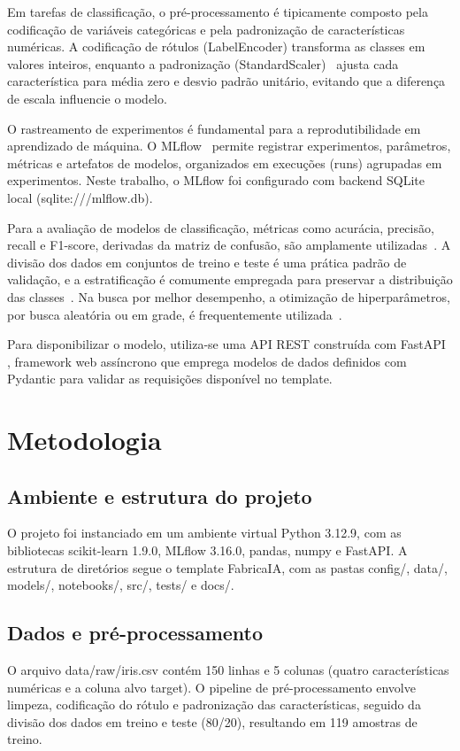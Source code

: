 \documentclass[12pt]{article}
\begin{document}
Em tarefas de classificação, o pré-processamento é tipicamente composto pela codificação de variáveis
categóricas e pela padronização de características numéricas. A codificação de rótulos (LabelEncoder)
transforma as classes em valores inteiros, enquanto a padronização (StandardScaler)~\cite{pedregosa2011sklearn} ajusta cada
característica para média zero e desvio padrão unitário, evitando que a diferença de escala influencie
o modelo.

O rastreamento de experimentos é fundamental para a reprodutibilidade em aprendizado de máquina. O MLflow~
\cite{zaharia2018mlflow} permite registrar experimentos, parâmetros, métricas e artefatos de modelos,
organizados em execuções (runs) agrupadas em experimentos. Neste trabalho, o MLflow foi configurado com
backend SQLite local (sqlite:///mlflow.db).

Para a avaliação de modelos de classificação, métricas como acurácia, precisão, recall e F1-score, 
derivadas da matriz de confusão, são amplamente utilizadas~\cite{sokolova2009systematic}. 
A divisão dos dados em conjuntos de treino e teste é uma prática padrão de validação, 
e a estratificação é comumente empregada para preservar a distribuição das classes~\cite{kohavi1995cross}. 
Na busca por melhor desempenho, a otimização de hiperparâmetros, por busca aleatória ou em grade, 
é frequentemente utilizada~\cite{bergstra2012random}.

Para disponibilizar o modelo, utiliza-se uma API REST construída com FastAPI~
\cite{ramirezfastapi}, framework web assíncrono que emprega modelos de dados definidos com Pydantic para validar 
as requisições disponível no template.

\section{Metodologia}

\subsection{Ambiente e estrutura do projeto}
O projeto foi instanciado em um ambiente virtual Python 3.12.9, com as bibliotecas scikit-learn 1.9.0,
MLflow 3.16.0, pandas, numpy e FastAPI. A estrutura de diretórios segue o template FabricaIA, com as
pastas config/, data/, models/, notebooks/, src/, tests/ e docs/.

\subsection{Dados e pré-processamento}
O arquivo data/raw/iris.csv contém 150 linhas e 5 colunas (quatro características numéricas e a coluna
alvo target). O pipeline de pré-processamento envolve limpeza, codificação do rótulo e padronização das
características, seguido da divisão dos dados em treino e teste (80/20), resultando em 119 amostras de
treino.
\end{document}
